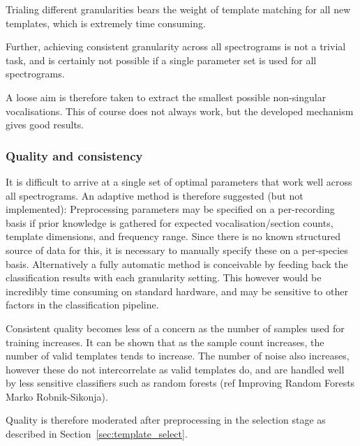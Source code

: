 Trialing different granularities bears the weight of template matching for all
new templates, which is extremely time consuming.

Further, achieving consistent granularity across all spectrograms is not a trivial
task, and is certainly not possible if a single parameter set is used for
all spectrograms.

A loose aim is therefore taken to extract the smallest possible non-singular
vocalisations.
This of course does not always work, but the developed mechanism gives good
results.

\subsubsection{Quality and consistency}
It is difficult to arrive at a single set of optimal parameters that work
well across all spectrograms.
An adaptive method is therefore suggested (but not implemented):
Preprocessing parameters may be specified on a per-recording basis if prior
knowledge is gathered for expected vocalisation/section counts, template
dimensions, and frequency range.
Since there is no known structured source of data for this, it is necessary to
manually specify these on a per-species basis.
Alternatively a fully automatic method is conceivable by feeding back the
classification results with each granularity setting.
This however would be incredibly time consuming on standard hardware, and may
be sensitive to other factors in the classification pipeline.

Consistent quality becomes less of a concern as the number of samples used for
training increases.
It can be shown that as the sample count increases, the number of valid templates
tends to increase.
The number of noise also increases, however these do not intercorrelate as valid
templates do, and are handled well by less sensitive classifiers such as
random forests (ref Improving Random Forests Marko Robnik-Sikonja).

Quality is therefore moderated after preprocessing in the selection stage as
described in Section~\ref{sec:template_select}.
